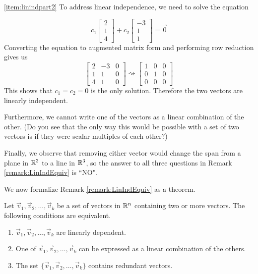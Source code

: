 \documentclass{ximera}
\begin{document}
\begin{example}
\begin{explanation}
 
 \ref{item:linindpart2} To address linear independence, we need to solve the equation
 
 $$c_1\begin{bmatrix}2\\1\\4\end{bmatrix}+c_2\begin{bmatrix}-3\\1\\1\end{bmatrix}=\vec{0}$$
 Converting the equation to augmented matrix form and performing row reduction gives us
 $$\left[\begin{array}{cc|c}  
 2&-3&0\\1&1&0\\4&1&0
 \end{array}\right]\rightsquigarrow\left[\begin{array}{cc|c}  
 1&0&0\\0&1&0\\0&0&0
 \end{array}\right]$$
 This shows that $c_1=c_2=0$ is the only solution.  Therefore the two vectors are linearly independent.
 
 Furthermore, we cannot write one of the vectors as a linear combination of the other.  (Do you see that the only way this would be possible with a set of two vectors is if they were scalar multiples of each other?)
 
Finally, we observe that removing either vector would change the span from a plane in $\mathbb{R}^3$ to a line in $\mathbb{R}^3$, so the answer to all three questions in Remark \ref{remark:LinIndEquiv} is ``NO".
\end{explanation}
\end{example}

We now formalize Remark \ref{remark:LinIndEquiv} as a theorem.

\begin{theorem}\label{th:lindeplincombofother}
Let $\vec{v}_1,\vec{v}_2,\dots ,\vec{v}_k$ be  a set of vectors in $\mathbb{R}^n$ containing two or more vectors.  The following conditions are equivalent.
\begin{enumerate}
\item\label{th:lindeplincombofother_a} 
$\vec{v}_1,\vec{v}_2,\dots ,\vec{v}_k$ are linearly dependent.
\item\label{th:lindeplincombofother_b} 
One of $\vec{v}_1,\vec{v}_2,\dots ,\vec{v}_k$ can be expressed as a linear combination of the others.
\item\label{th:lindeplincombofother_c} 
The set $\{\vec{v}_1,\vec{v}_2,\dots ,\vec{v}_k\}$ contains redundant vectors.
\end{enumerate}
\end{theorem}
\end{document}
